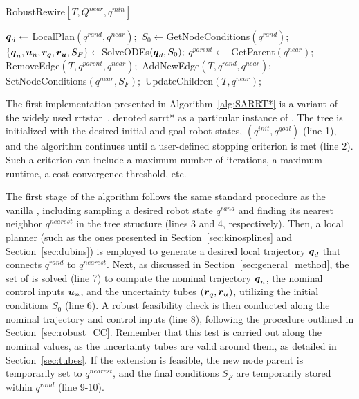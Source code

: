 \begin{algorithm}[t]
    \caption{RobustRewire$[T, Q^{near}, q^{min}]$}\label{alg:RobustRewire}
    \begin{algorithmic}[1]
            \State $\boldsymbol{q}_d \gets$ LocalPlan$(q^{rand}, q^{near});$
            \State $S_0 \gets $GetNodeConditions$({q^{rand}});$
            \State $\left \{\boldsymbol{q}_n, \boldsymbol{u}_n, \boldsymbol{r_q}, \boldsymbol{r_u}, S_F \right \}  \gets $SolveODEs$(\boldsymbol{q}_d, S_0);$
                    \State $q^{parent} \gets$ GetParent$(q^{near});$
                    \State RemoveEdge$(T, q^{parent}, q^{near});$
                    \State AddNewEdge$(T, q^{rand}, q^{near});$
                    \State SetNodeConditions$(q^{near}, S_{F});$
                    \State UpdateChildren$(T, q^{near});$
                \EndIf
            \EndIf
        \EndFor
    \end{algorithmic}
\end{algorithm}

The first implementation presented in Algorithm~\ref{alg:SARRT*} is a variant of the widely used \gls{rrtstar}~\cite{cRRTstar}, denoted \gls{sarrt*} as a particular instance of .
The tree is initialized with the desired initial and goal robot states, $(q^{init}, q^{goal})$ (line 1), and the algorithm continues until a user-defined stopping criterion is met (line 2).
Such a criterion can include a maximum number of iterations, a maximum runtime, a cost convergence threshold, etc.

The first stage of the algorithm follows the same standard procedure as the vanilla , including sampling a desired robot state $q^{rand}$ and finding its nearest neighbor $q^{nearest}$ in the tree structure (lines 3 and 4, respectively).
Then, a local planner (such as the ones presented in Section~\ref{sec:kinosplines} and Section~\ref{sec:dubins}) is employed to generate a desired local trajectory $\boldsymbol{q}_d$ that connects $q^{rand}$ to $q^{nearest}$.
Next, as discussed in Section~\ref{sec:general_method}, the set of  is solved (line 7) to compute the nominal trajectory $\boldsymbol{q}_n$, the nominal control inputs $\boldsymbol{u}_n$, and the uncertainty tubes $(\boldsymbol{r_q}, \boldsymbol{r_u})$, utilizing the initial conditions $S_0$ (line 6).
A robust feasibility check is then conducted along the nominal trajectory and control inputs (line 8), following the procedure outlined in Section~\ref{sec:robust_CC}.
Remember that this test is carried out along the nominal values, as the uncertainty tubes are valid around them, as detailed in Section~\ref{sec:tubes}.
If the extension is feasible, the new node parent is temporarily set to $q^{nearest}$, and the final conditions $S_F$ are temporarily stored within $q^{rand}$ (line 9-10).

